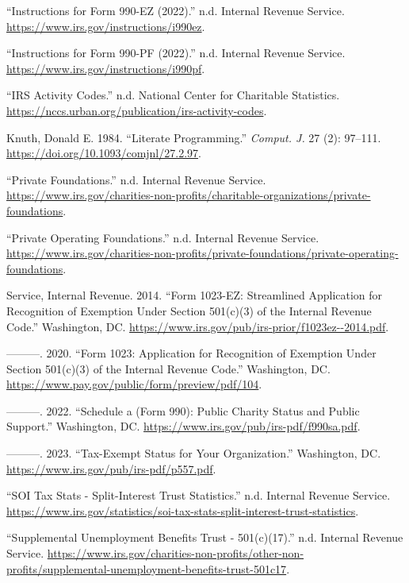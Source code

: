 \documentclass[
  letterpaper,
  DIV=11,
  numbers=noendperiod]{scrreprt}
\newlength{\cslhangindent}
\newlength{\cslentryspacingunit} %
\newenvironment{CSLReferences}[2] %
 {%
  \setlength{\parindent}{0pt}
  \ifodd #1
  \let\oldpar\par
  \def\par{\hangindent=\cslhangindent\oldpar}
  \fi
  \setlength{\parskip}{#2\cslentryspacingunit}
 }%
 {}
\begin{document}
\begin{CSLReferences}{1}{0}
\leavevmode{}%
{``Instructions for Form 990-EZ (2022).''} n.d. Internal Revenue
Service. \url{https://www.irs.gov/instructions/i990ez}.

\leavevmode{}%
{``Instructions for Form 990-PF (2022).''} n.d. Internal Revenue
Service. \url{https://www.irs.gov/instructions/i990pf}.

\leavevmode{}%
{``IRS Activity Codes.''} n.d. National Center for Charitable
Statistics. \url{https://nccs.urban.org/publication/irs-activity-codes}.

\leavevmode{}%
Knuth, Donald E. 1984. {``Literate Programming.''} \emph{Comput. J.} 27
(2): 97--111. \url{https://doi.org/10.1093/comjnl/27.2.97}.

\leavevmode{}%
{``Private Foundations.''} n.d. Internal Revenue Service.
\url{https://www.irs.gov/charities-non-profits/charitable-organizations/private-foundations}.

\leavevmode{}%
{``Private Operating Foundations.''} n.d. Internal Revenue Service.
\url{https://www.irs.gov/charities-non-profits/private-foundations/private-operating-foundations}.

\leavevmode{}%
Service, Internal Revenue. 2014. {``Form 1023-EZ: Streamlined
Application for Recognition of Exemption Under Section 501(c)(3) of the
Internal Revenue Code.''} Washington, DC.
\url{https://www.irs.gov/pub/irs-prior/f1023ez--2014.pdf}.

\leavevmode{}%
---------. 2020. {``Form 1023: Application for Recognition of Exemption
Under Section 501(c)(3) of the Internal Revenue Code.''} Washington, DC.
\url{https://www.pay.gov/public/form/preview/pdf/104}.

\leavevmode{}%
---------. 2022. {``Schedule a (Form 990): Public Charity Status and
Public Support.''} Washington, DC.
\url{https://www.irs.gov/pub/irs-pdf/f990sa.pdf}.

\leavevmode{}%
---------. 2023. {``Tax-Exempt Status for Your Organization.''}
Washington, DC. \url{https://www.irs.gov/pub/irs-pdf/p557.pdf}.

\leavevmode{}%
{``SOI Tax Stats - Split-Interest Trust Statistics.''} n.d. Internal
Revenue Service.
\url{https://www.irs.gov/statistics/soi-tax-stats-split-interest-trust-statistics}.

\leavevmode{}%
{``Supplemental Unemployment Benefits Trust - 501(c)(17).''} n.d.
Internal Revenue Service.
\url{https://www.irs.gov/charities-non-profits/other-non-profits/supplemental-unemployment-benefits-trust-501c17}.

\end{CSLReferences}
\end{document}
